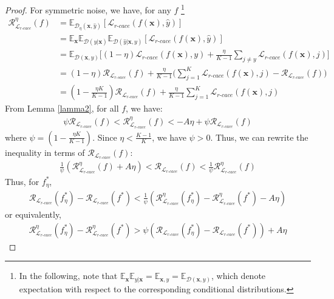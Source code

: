 \documentclass{article}
\begin{document}
\begin{proof}
	For symmetric noise, we have, for any $f$ \footnote{In the following, note that $\mathbb{E}_{\bm{x}}\mathbb{E}_{y|\bm{x}}=\mathbb{E}_{\bm{x},y}=\mathbb{E}_{\mathcal{D}(\bm{x},y)}$, which denote expectation with respect to the corresponding conditional distributions.}
	\begin{align}
		\mathcal{R}^{\eta}_{\mathcal{L}_{r\textrm{-}cace}}(f) &= \nonumber \mathbb{E}_{\mathcal{D}_{\eta}(\bm{x},\hat{y})}[\mathcal{L}_{r\textrm{-}cace}(f(\bm{x}),\hat{y})] \\
		&=\mathbb{E}_{\bm{x}}\mathbb{E}_{\mathcal{D}(y|\bm{x})}\mathbb{E}_{\mathcal{D}(\hat{y}|\bm{x},y)}[\mathcal{L}_{r\textrm{-}cace}(f(\bm{x}),\hat{y})]\nonumber\\\nonumber
		&=\mathbb{E}_{\mathcal{D}(\bm{x},y)}\big[(1-\eta)\mathcal{L}_{r\textrm{-}cace}(f(\bm{x}),y) +\frac{\eta}{K-1}{\sum}_{j\ne y}\mathcal{L}_{r\textrm{-}cace}(f(\bm{x}),j)\big] \nonumber \\
		&=(1-\eta)\mathcal{R}_{\mathcal{L}_{r\textrm{-}sace}}(f)+\frac{\eta}{K-1}\Big(\sum_{j=1}^{K}\mathcal{L}_{r\textrm{-}cace}(f(\bm{x}),j)-\mathcal{R}_{\mathcal{L}_{r\textrm{-}cace}}(f)\Big) \nonumber \\
		&= (1-\frac{\eta K}{K-1})\mathcal{R}_{\mathcal{L}_{r\textrm{-}cace}}(f) + \frac{\eta}{K-1}\sum_{j=1}^{K}\mathcal{L}_{r\textrm{-}cace}(f(\bm{x}),j) \nonumber
	\end{align}
	From Lemma \ref{lamma2}, for all $f$, we have:
	\begin{align}
		\psi\mathcal{R}_{\mathcal{L}_{r\textrm{-}cace}}(f)	 < \mathcal{R}^{\eta}_{\mathcal{L}_{r\textrm{-}cace}}(f) < -A\eta +\psi\mathcal{R}_{\mathcal{L}_{r\textrm{-}cace}}(f) \nonumber
	\end{align}
	where $\psi=(1-\frac{\eta K}{K-1})$. Since $\eta < \frac{K-1}{K}$, we have $\psi >0 $. Thus, we can rewrite the inequality in terms of $\mathcal{R}_{\mathcal{L}_{r\textrm{-}cace}}(f)$:
	\begin{align}
		\frac{1}{\psi}(\mathcal{R}^{\eta}_{\mathcal{L}_{r\textrm{-}cace}}(f) +A\eta)
		<\mathcal{R}_{\mathcal{L}_{r\textrm{-}cace}}(f) <\frac{1}{\psi} \mathcal{R}^{\eta}_{\mathcal{L}_{r\textrm{-}cace}}(f)\nonumber
	\end{align}
	Thus, for $f^{*}_{\eta}$, 
	\begin{align}
		\mathcal{R}_{\mathcal{L}_{r\textrm{-}cace}}(f^{*}_{\eta}) - \mathcal{R}_{\mathcal{L}_{r\textrm{-}cace}}(f^{*}) < \frac{1}{\psi} ( \mathcal{R}^{\eta}_{\mathcal{L}_{r\textrm{-}cace}}(f^{*}_{\eta}) - \mathcal{R}^{\eta}_{\mathcal{L}_{r\textrm{-}cace}}(f^{*}) - A\eta) \nonumber
	\end{align}
	or equivalently,
	\begin{align}
		\mathcal{R}^{\eta}_{\mathcal{L}_{r\textrm{-}cace}}(f^{*}_{\eta}) - \mathcal{R}^{\eta}_{\mathcal{L}_{r\textrm{-}cace}}(f^{*}) > \psi (\mathcal{R}_{\mathcal{L}_{r\textrm{-}cace}}(f^{*}_{\eta})-\mathcal{R}_{\mathcal{L}_{r\textrm{-}cace}}(f^{*}))+A\eta \nonumber
	\end{align}
	

\end{proof}
\end{document}
